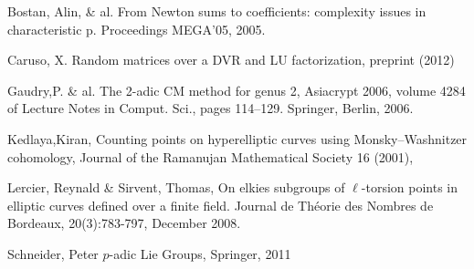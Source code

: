 \documentclass{amsart}
\begin{document}
%

%
%

\tiny 
\begin{thebibliography}{10}

{\sc Bostan, Alin, \& al.} 
\newblock From Newton sums to coefficients: complexity issues in characteristic p. Proceedings MEGA'05, 2005. 

{\sc Caruso, X.}
\newblock Random matrices over a DVR and LU factorization, preprint (2012)

{\sc Gaudry,P. \& al.} 
\newblock The 2-adic CM method for genus 2, Asiacrypt 2006, volume 4284 of Lecture Notes in Comput. Sci., pages 114–129. Springer, Berlin, 2006.

{\sc Kedlaya,Kiran,} 
\newblock Counting points on hyperelliptic curves using Monsky--Washnitzer cohomology, Journal of the Ramanujan Mathematical Society 16 (2001), 

{\sc Lercier, Reynald \&  Sirvent, Thomas,} 
\newblock On elkies subgroups of $\ell$-torsion points in elliptic curves defined over a finite field. Journal de Théorie des Nombres de Bordeaux, 20(3):783-797, December 2008.

{\sc Schneider, Peter}
\newblock $p$-adic Lie Groups, Springer, 2011



\end{thebibliography}
\end{document}

